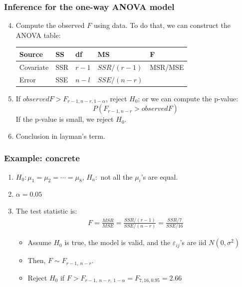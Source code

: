 \documentclass[handout]{beamer}\usepackage[]{graphicx}\usepackage[]{color}
\providecommand{\e}{\varepsilon}
\providecommand{\q}{$\quad$ \newline}
\numberwithin{equation}{section}
\begin{document}
\begin{frame}
\frametitle{Inference for the one-way ANOVA model}
\begin{enumerate}
\setcounter{enumi}{3}
\item Compute the observed $F$ using data. To do that, we can construct the ANOVA table: \q
\begin{center}
\pause \begin{tabular}{lllll}
Source & SS & df & MS & F  \\ \hline
Covariate & SSR & $r-1$ & $SSR/(r-1)$ & MSR/MSE \\ 
Error & SSE & $n-l$ & $SSE/(n-r)$ & 
\end{tabular}
\end{center}
\item If $observed F >  F_{r-1, n-r, 1 - \alpha}$, reject $H_0$; or we can compute the p-value: 
\[P(F_{r-1, n-r} > observed F)\]
If the p-value is small, we reject $H_0$.
\item
Conclusion in layman's term.
\end{enumerate}
\end{frame}


\begin{frame}
\frametitle{Example: concrete}
\begin{enumerate}[1. ]
\item $H_0: \mu_1 = \mu_2 = \cdots = \mu_8$, $H_a:$ not all the $\mu_i$'s are equal.
\pause \item $\alpha = 0.05$
\pause \item The test statistic is:
\pause \begin{align*}
F = \frac{MSR}{MSE} = \frac{SSR/(r-1)}{SSE/(n-r)} = \frac{SSR/7}{SSE/16}
\end{align*}
\begin{itemize}
\pause \item Assume $H_0$ is true, the model is valid, and the $\e_{ij}$'s are iid $N(0, \sigma^2)$
\pause \item Then, $F \sim F_{r -1, \ n - r}$. 
\pause \item Reject $H_0$ if $F > F_{r - 1, \ n - r, \ 1 - \alpha} = F_{7, 16, 0.95} = 2.66$
\end{itemize}
\end{enumerate}
\end{frame}
\end{document}
